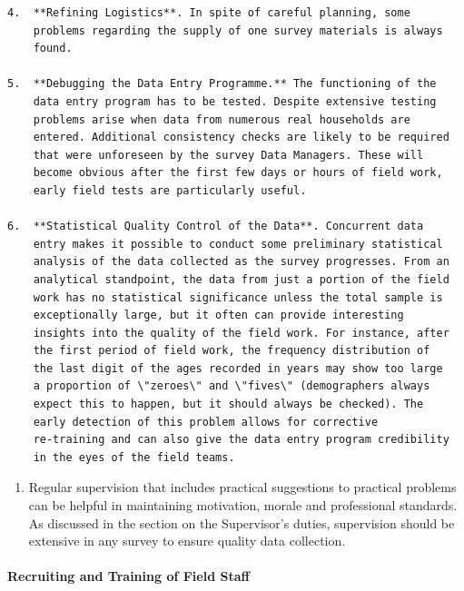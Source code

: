 \documentclass[
]{article}
\providecommand{\tightlist}{%
  \setlength{\itemsep}{0pt}\setlength{\parskip}{0pt}}
\begin{document}
\begin{verbatim}
4.  **Refining Logistics**. In spite of careful planning, some
    problems regarding the supply of one survey materials is always
    found.

5.  **Debugging the Data Entry Programme.** The functioning of the
    data entry program has to be tested. Despite extensive testing
    problems arise when data from numerous real households are
    entered. Additional consistency checks are likely to be required
    that were unforeseen by the survey Data Managers. These will
    become obvious after the first few days or hours of field work,
    early field tests are particularly useful.

6.  **Statistical Quality Control of the Data**. Concurrent data
    entry makes it possible to conduct some preliminary statistical
    analysis of the data collected as the survey progresses. From an
    analytical standpoint, the data from just a portion of the field
    work has no statistical significance unless the total sample is
    exceptionally large, but it often can provide interesting
    insights into the quality of the field work. For instance, after
    the first period of field work, the frequency distribution of
    the last digit of the ages recorded in years may show too large
    a proportion of \"zeroes\" and \"fives\" (demographers always
    expect this to happen, but it should always be checked). The
    early detection of this problem allows for corrective
    re-training and can also give the data entry program credibility
    in the eyes of the field teams.
\end{verbatim}

\begin{enumerate}
\def\labelenumi{\arabic{enumi}.}
\setcounter{enumi}{332}
\tightlist
\item
  Regular supervision that includes practical suggestions to
  practical problems can be helpful in maintaining motivation, morale
  and professional standards. As discussed in the section on the
  Supervisor's duties, supervision should be extensive in any survey
  to ensure quality data collection.
\end{enumerate}

\hypertarget{recruiting-and-training-of-field-staff}{%
\paragraph{Recruiting and Training of Field Staff}\label{recruiting-and-training-of-field-staff}}
\end{document}
